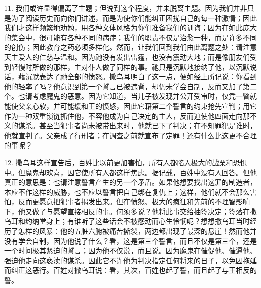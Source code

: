 11. 我们或许显得偏离了主题；但说到这个程度，并未脱离主题。因为我们并非只是为了阅读历史而向你们讲述，而是为使你们能纠正困扰自己的每一种激情；因此我们才这样频繁地劝勉，用各种文体风格为你们准备我们的训诲；因为在如此庞大的集会中，很可能有各种不同的病症；我们的职责不仅是治愈一种，而是许多不同的创伤；因此教育之药必须多样化。然而，让我们回到我们由此离题之处：请注意天主爱人的仁慈与温和。因为祂没有发出雷霆，也没有震动大地；而是像朋友们受到轻慢时所做的那样，主对仆人做了同样的事。祂只是沉默地接纳了他，以沉默说话，藉沉默表达了祂全部的愤怒。撒乌耳明白了这一点，便如经上所记说：你看到他的轻率了吗？他意识到第一个誓言已被违背，却仍未学会自制，反而又加了第二个。也请考虑魔鬼的恶意。因为它知道，当儿子被发现并公开受审时，仅凭一瞥就能使父亲心软，并可能缓和王的愤怒，因此它藉第二个誓言的约束抢先宣判；用它作为一种双重锁链抓住他，不容他成为自己决定的主人，反而迫使他四面走向那不义的谋杀。甚至当犯事者尚未被带出来时，他就已下了判决；在不知罪犯是谁时，他就宣判了。父亲成了行刑者；在调查之前就宣布了定罪！还有什么比这更不合理的事呢？\par

12. 撒乌耳这样宣告后，百姓比以前更加害怕，所有人都陷入极大的战栗和恐惧中。但魔鬼却欢喜，因它使所有人都这样焦虑。据记载，百姓中没有人回答。但他真正的意思是：也请注意誓言产生的另一个矛盾。如果他想要找出这罪的制造者，本应不作这样的威胁，也不应以誓言把自己绑在复仇上；这样，他们就不会那么害怕，反而更愿意把犯事者揭发出来。但在愤怒、极大的疯狂和先前的不理智影响下，他又做了与愿望直接相反的事。何须多说？他将此事交给抽签决定；签落在撒乌耳和约纳堂身上；有谁听了这些话会不被感动而心生怜悯呢？想想撒乌耳当时经历了怎样的风暴：他的五脏六腑被痛苦撕裂，两边都出现了最深的悬崖！然而他并没有学会自制，因为他说了什么？看，这是第三个誓言，而且不仅是第三个，还是一个时间极其紧迫的誓言；因为他不仅说，而且说。因为魔鬼在催促他、催逼他、强迫他走向这亵渎的谋杀。因此它不许他为判决指定任何将来的日子，以免因拖延而纠正这恶行。百姓对撒乌耳说：看，其次，百姓也起了誓，而且起了与王相反的誓。\par

